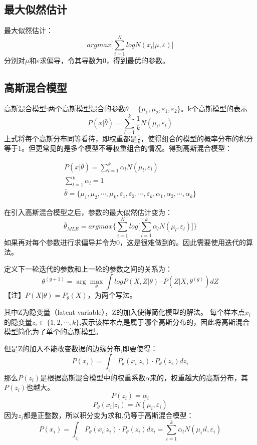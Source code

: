 \documentclass[UTF8]{ctexart} %
\begin{document}
		\subsection{最大似然估计}
		最大似然估计：
		\[argmax\Big[\sum_{i=1}^NlogN(x_i|\mu,\varepsilon)\Big]\]
		分别对$\mu$和$\varepsilon$求偏导，令其导数为0，得到最优的参数。
		
		\subsection{高斯混合模型}
		高斯混合模型:两个高斯模型混合的参数$\bar{\theta}=\{\mu_1,\mu_2,\varepsilon_1,\varepsilon_2\}$。k个高斯模型的表示
		\[P(x|\bar{\theta}) = \sum_{l=1}^k\frac{1}{k}N(\mu_l,\varepsilon_l)\]
		上式将每个高斯分布同等看待，即权重都是$\frac{1}{k}$，使得组合的模型的概率分布的积分等于1。但更常见的是多个模型不等权重组合的情况。得到高斯混合模型：
		
		\begin{gather}
		P(x|\bar{\theta}) = \sum_{l=1}^k\alpha_lN(\mu_l,\varepsilon_l)\\
		\sum_{l=1}^k\alpha_l=1\\
		\bar{\theta}=\{\mu_1,\mu_2,\cdots,\mu_k,\varepsilon_1,\varepsilon_2,\cdots,\varepsilon_k,\alpha_1,\alpha_2,\cdots,\alpha_k\}
		\end{gather}
		
		在引入高斯混合模型之后，参数的最大似然估计变为：
		\[\bar{\theta}_{MLE} = argmax\Big\{\sum_{i=1}^Nlog\big[\sum_{l=1}^k\alpha_lN(\mu_l,\varepsilon_l)\big]\Big\}\]
		如果再对每个参数进行求偏导并令为0，这是很难做到的。因此需要使用迭代的算法。
		
		定义下一轮迭代的参数和上一轮的参数之间的关系为：
		\[\theta^{(g+1)} = \arg\max_{\theta}\int logP(X,Z|\theta)\cdot P(Z|X,\theta^{(g)})dZ\]
		【注】$P(X|\theta) = P_{\theta}(X)$，为两个写法。
		 
		其中Z为隐变量（latent variable），Z的加入使得简化模型的解法。
		每个样本点$x_i$的隐变量$z_i\subset \{1,2,\cdots ,k\}$,表示该样本点是属于哪个高斯分布的，因此将高斯混合模型简化为了单个的高斯模型。
		
		但是Z的加入不能改变数据的边缘分布,即要使得：
		\[P(x_i) = \int_{z_i}P_\theta(x_i|z_i)\cdot P_\theta(z_i)dz_i\]
		那么$P(z_i)$是根据高斯混合模型中的权重系数$\alpha$来的，权重越大的高斯分布，其$P(z_i)$也越大。
		\[P(z_i) = \alpha_i\]
		\[P_\theta(x_i|z_i) = N(\mu_i,\varepsilon_i)\]
		因为$z_i$都是正整数，所以积分变为求和,仍等于高斯混合模型：
		\[P(x_i) = \int_{z_i}P_\theta(x_i|z_i)\cdot P_\theta(z_i)dz_i = \sum_{i=1}^k\alpha_lN(\mu_iil,\varepsilon_i)\]
		
\end{document}
